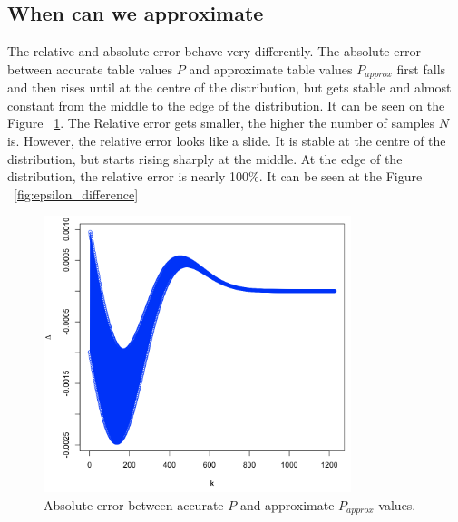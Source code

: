 \documentclass[12pt]{article}
\begin{document}
\subsection{When can we approximate}
The relative and absolute error behave very differently. The absolute error between accurate table values $P$ and approximate table values $P_{approx}$ first falls and then rises until at the centre of the distribution, but gets stable and almost constant from the middle to the edge of the distribution. It can be seen on the Figure ~\ref{fig:absolute_difference}. The Relative error gets smaller, the higher the number of samples $N$ is. However, the relative error looks like a slide. It is stable at the centre of the distribution, but starts rising sharply at the middle. At the edge of the distribution, the relative error is nearly 100\%. It can be seen at the Figure ~\ref{fig:epsilon_difference}

\begin{figure}[H]
  \centering
  \includegraphics[width=0.8\textwidth]{approximate_accurate_difference}
  \caption{Absolute error between accurate $P$ and approximate $P_{approx}$ values.}
  \label{fig:absolute_difference}
\end{figure}
\end{document}
